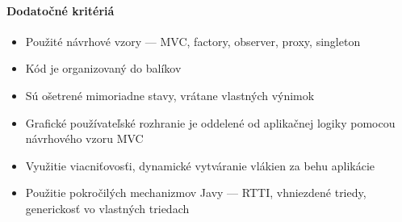 \documentclass[11pt]{article}
\begin{document}
\paragraph{Dodatočné kritériá}
\begin{itemize}
	\item Použité návrhové vzory --- MVC, factory, observer, proxy, singleton
	\item Kód je organizovaný do balíkov
	\item Sú ošetrené mimoriadne stavy, vrátane vlastných výnimok
	\item Grafické používateľské rozhranie je oddelené od aplikačnej logiky
	      pomocou návrhového vzoru MVC
	\item Využitie viacniťovosťi, dynamické vytváranie vlákien za behu aplikácie
	\item Použitie pokročilých mechanizmov Javy --- RTTI, vhniezdené triedy,
	      generickosť vo vlastných triedach
\end{itemize}
\end{document}
